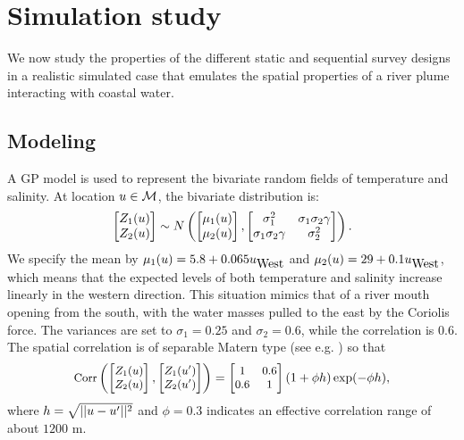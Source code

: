 \documentclass[aoas]{imsart}
\begin{document}
\section{Simulation study}
\label{sec:simulations}

We now study the properties of
the different static and sequential survey designs in a realistic
simulated case that emulates the spatial properties of a river plume interacting with coastal water. 

\subsection{Modeling}

A GP model is used to represent the bivariate random fields of
temperature and salinity. At location $u \in \mathcal{M}$, the
bivariate distribution is:
\begin{equation}\label{gp_bar}
\begin{bmatrix}Z_1(\x) \\
Z_2(\x) \end{bmatrix}
\sim N \left( 
\begin{bmatrix} \mu_{1}(\x)\\
\mu_{2}(\x)
\end{bmatrix},\begin{bmatrix}
\sigma_{1}^2 & \sigma_{1} \sigma_2 \gamma \\
\sigma_{1} \sigma_2 \gamma  & \sigma_{2}^2 
\end{bmatrix}
\right).
\end{equation}
We specify the mean by 
$\mu_{1}(u)=5.8 + 0.065 u_{\mbox{West}}$ and
$\mu_{2}(u)=29 + 0.1 u_{\mbox{West}}$, which means that the expected levels of both temperature and salinity increase linearly in the western direction.
This situation
mimics that of a river mouth opening from the south, with the water masses pulled to the east by the Coriolis force. 
The variances are set to $\sigma_1=0.25$ and $\sigma_2=0.6$, while the correlation is $0.6$. 
The spatial correlation is of separable Matern type (see e.g. \cite{Cressie:11}) so that
\begin{equation}\label{v}
\small
\mbox{Corr} 
\left(
\begin{bmatrix}
    Z_1(\x) \\
    Z_2(\x) 
    \end{bmatrix},
    \begin{bmatrix}
    Z_1(\x') \\
    Z_2(\x') 
    \end{bmatrix}
    \right)
    = \begin{bmatrix}
1 & 0.6  \\
0.6  & 1
\end{bmatrix}(1+\phi h)\exp (-\phi h),
\end{equation}
where $h=\sqrt{||u-u'||^2}$ and $\phi=0.3$ indicates an effective correlation range of about $1200$ m. 
\end{document}
